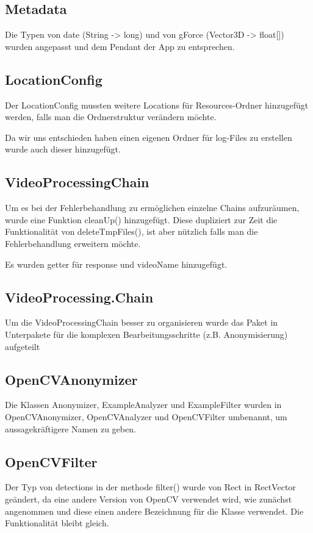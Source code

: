 \subsection{Metadata}
Die Typen von date (String -> long) und von gForce (Vector3D -> float[]) wurden angepasst und dem Pendant der App zu entsprechen.

\subsection{LocationConfig}
Der LocationConfig mussten weitere Locations für Resources-Ordner hinzugefügt werden, falls man die Ordnerstruktur verändern möchte. \par
Da wir uns entschieden haben einen eigenen Ordner für log-Files zu erstellen wurde auch dieser hinzugefügt.

\subsection{VideoProcessingChain}
Um es bei der Fehlerbehandlung zu ermöglichen einzelne Chains aufzuräumen, wurde eine Funktion cleanUp() hinzugefügt. Diese dupliziert zur Zeit die Funktionalität von deleteTmpFiles(), ist aber nützlich falls man die Fehlerbehandlung erweitern möchte. \par 
Es wurden getter für response und videoName hinzugefügt.

\subsection{VideoProcessing.Chain}
Um die VideoProcessingChain besser zu organisieren wurde das Paket in Unterpakete für die komplexen Bearbeitungsschritte (z.B. Anonymisierung) aufgeteilt

\subsection{OpenCVAnonymizer}
Die Klassen Anonymizer, ExampleAnalyzer und ExampleFilter wurden in OpenCVAnonymizer, OpenCVAnalyzer und OpenCVFilter umbenannt, um aussagekräftigere Namen zu geben.

\subsection{OpenCVFilter}
Der Typ von detections in der methode filter() wurde von Rect in RectVector geändert, da eine andere Version von OpenCV verwendet wird, wie zunächst angenommen und diese einen andere Bezeichnung für die Klasse verwendet. Die Funktionalität bleibt gleich.

